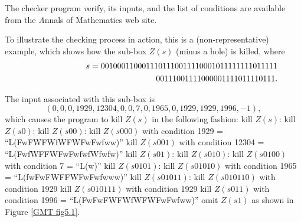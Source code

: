 The checker program {\textit verify}, its inputs, and the list of conditions
are available from the {\textit Annals of Mathematics} web site.
\begin{example} \label{GMT 5.4}
To illustrate the checking process in action, this is a (non-representative)
example, which shows how the sub-box $Z(s)$ (minus a hole) is killed,
where
\begin{eqnarray*}
&&s=0010001100011101110011110001011111111011111\\
&&\hskip2in 00111001111000001111011110111. 
\end{eqnarray*}

The input associated with this sub-box is
$$(0, 0, 0, 1929, 12304, 0, 0, 7, 0, 1965, 0, 1929, 1929, 1996, -1),$$
which causes the program to kill $Z(s)$ in the following fashion:
{\noindent\obeylines
\def\>{\hskip 0.05in}
 kill $Z(s)$:
\>kill $Z(s0)$:
\>\>kill $Z(s00)$:
\>\>\>kill $Z(s000)$ with condition 1929 = ``L(FwFWFWfWFWFwFwfww)''
\>\>\>kill $Z(s001)$ with condition 12304 = ``L(FwfWFFWFwFwfwfWfwfw)''
\>\>kill $Z(s01)$:
\>\>\>kill $Z(s010)$:
\>\>\>\>kill $Z(s0100)$ with condition 7 = ``L(w)''
\>\>\>\>kill $Z(s0101)$:
\>\>\>\>\>kill $Z(s01010)$ with condition 1965 = ``L(fwFwFWFFWFwFwfwww)''
\>\>\>\>\>kill $Z(s01011)$:
\>\>\>\>\>\>kill $Z(s010110)$ with condition 1929
\>\>\>\>\>\>kill $Z(s010111)$ with condition 1929
\>\>\>kill $Z(s011)$ with condition 1996 = ``L(FwFwFWFWfWFWFwFwfww)''
\>omit $Z(s1)$
\noindent as shown in Figure \ref{GMT fig5.1}.
}


\end{example}
